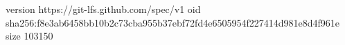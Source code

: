 version https://git-lfs.github.com/spec/v1
oid sha256:f8e3ab6458bb10b2c73cba955b37ebf72fd4e6505954f227414d981e8d4f961e
size 103150
